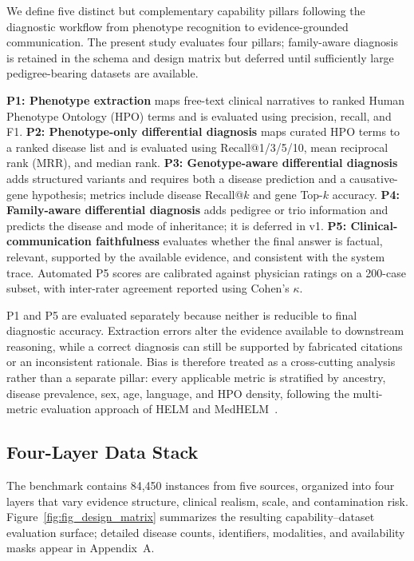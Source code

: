 \documentclass[letterpaper]{article} %
\begin{document}
We define five distinct but complementary capability pillars following the diagnostic workflow from phenotype recognition to evidence-grounded communication. The present study evaluates four pillars; family-aware diagnosis is retained in the schema and design matrix but deferred until sufficiently large pedigree-bearing datasets are available.

\textbf{P1: Phenotype extraction} maps free-text clinical narratives to ranked Human Phenotype Ontology (HPO) terms and is evaluated using precision, recall, and F1. \textbf{P2: Phenotype-only differential diagnosis} maps curated HPO terms to a ranked disease list and is evaluated using Recall@1/3/5/10, mean reciprocal rank (MRR), and median rank. \textbf{P3: Genotype-aware differential diagnosis} adds structured variants and requires both a disease prediction and a causative-gene hypothesis; metrics include disease Recall@$k$ and gene Top-$k$ accuracy. \textbf{P4: Family-aware differential diagnosis} adds pedigree or trio information and predicts the disease and mode of inheritance; it is deferred in v1. \textbf{P5: Clinical-communication faithfulness} evaluates whether the final answer is factual, relevant, supported by the available evidence, and consistent with the system trace. Automated P5 scores are calibrated against physician ratings on a 200-case subset, with inter-rater agreement reported using Cohen's $\kappa$.

P1 and P5 are evaluated separately because neither is reducible to final diagnostic accuracy. Extraction errors alter the evidence available to downstream reasoning, while a correct diagnosis can still be supported by fabricated citations or an inconsistent rationale. Bias is therefore treated as a cross-cutting analysis rather than a separate pillar: every applicable metric is stratified by ancestry, disease prevalence, sex, age, language, and HPO density, following the multi-metric evaluation approach of HELM and MedHELM~\cite{liang2023helm,bedi2026medhelm}.

\subsection{Four-Layer Data Stack}
\label{sec-4-2}

The benchmark contains 84,450 instances from five sources, organized into four layers that vary evidence structure, clinical realism, scale, and contamination risk. Figure~\ref{fig:fig_design_matrix} summarizes the resulting capability--dataset evaluation surface; detailed disease counts, identifiers, modalities, and availability masks appear in Appendix~A.
\end{document}
